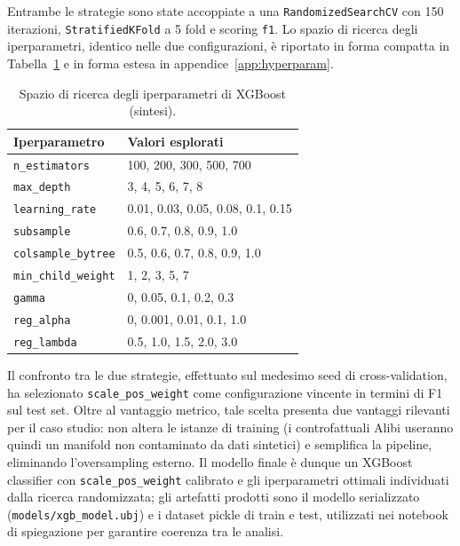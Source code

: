 Entrambe le strategie sono state accoppiate a una \texttt{RandomizedSearchCV} con \num{150} iterazioni, \texttt{StratifiedKFold} a \num{5} fold e scoring \texttt{f1}. Lo spazio di ricerca degli iperparametri, identico nelle due configurazioni, è riportato in forma compatta in Tabella~\ref{tab:hyperparam_space} e in forma estesa in appendice~\ref{app:hyperparam}.

\begin{table}[htbp]
    \centering
    \caption{Spazio di ricerca degli iperparametri di XGBoost (sintesi).}
    \label{tab:hyperparam_space}
    \begin{tabular}{ll}
        \toprule
        Iperparametro & Valori esplorati \\
        \midrule
        \texttt{n\_estimators}    & 100, 200, 300, 500, 700 \\
        \texttt{max\_depth}       & 3, 4, 5, 6, 7, 8 \\
        \texttt{learning\_rate}   & 0.01, 0.03, 0.05, 0.08, 0.1, 0.15 \\
        \texttt{subsample}        & 0.6, 0.7, 0.8, 0.9, 1.0 \\
        \texttt{colsample\_bytree}& 0.5, 0.6, 0.7, 0.8, 0.9, 1.0 \\
        \texttt{min\_child\_weight}& 1, 2, 3, 5, 7 \\
        \texttt{gamma}            & 0, 0.05, 0.1, 0.2, 0.3 \\
        \texttt{reg\_alpha}       & 0, 0.001, 0.01, 0.1, 1.0 \\
        \texttt{reg\_lambda}      & 0.5, 1.0, 1.5, 2.0, 3.0 \\
        \bottomrule
    \end{tabular}
\end{table}

Il confronto tra le due strategie, effettuato sul medesimo seed di cross-validation, ha selezionato \texttt{scale\_pos\_weight} come configurazione vincente in termini di F1 sul test set. Oltre al vantaggio metrico, tale scelta presenta due vantaggi rilevanti per il caso studio: non altera le istanze di training (i controfattuali Alibi useranno quindi un manifold non contaminato da dati sintetici) e semplifica la pipeline, eliminando l'oversampling esterno. Il modello finale è dunque un XGBoost classifier con \texttt{scale\_pos\_weight} calibrato e gli iperparametri ottimali individuati dalla ricerca randomizzata; gli artefatti prodotti sono il modello serializzato (\texttt{models/xgb\_model.ubj}) e i dataset pickle di train e test, utilizzati nei notebook di spiegazione per garantire coerenza tra le analisi.

